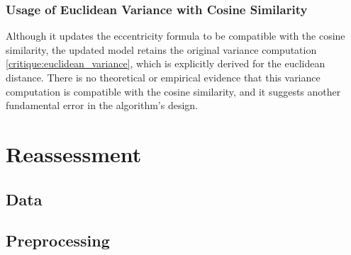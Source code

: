 \documentclass[a4paper]{article}
\begin{document}
\subsubsection{Usage of Euclidean Variance with Cosine Similarity}

Although it updates the eccentricity formula to be compatible with the cosine similarity, the updated model retains the original variance computation \ref{critique:euclidean_variance}, which is explicitly derived for the euclidean distance. There is no theoretical or empirical evidence that this variance computation is compatible with the cosine similarity, and it suggests another fundamental error in the algorithm's design.

\section{Reassessment}


\subsection{Data}


\subsection{Preprocessing}

\end{document}
